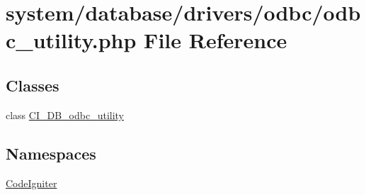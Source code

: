 \hypertarget{odbc__utility_8php}{}\section{system/database/drivers/odbc/odbc\+\_\+utility.php File Reference}
\label{odbc__utility_8php}
\subsection*{Classes}
\begin{DoxyCompactItemize}
\item 
class \mbox{\hyperlink{class_c_i___d_b__odbc__utility}{C\+I\+\_\+\+D\+B\+\_\+odbc\+\_\+utility}}
\end{DoxyCompactItemize}
\subsection*{Namespaces}
\begin{DoxyCompactItemize}
\item 
 \mbox{\hyperlink{namespace_code_igniter}{Code\+Igniter}}
\end{DoxyCompactItemize}
